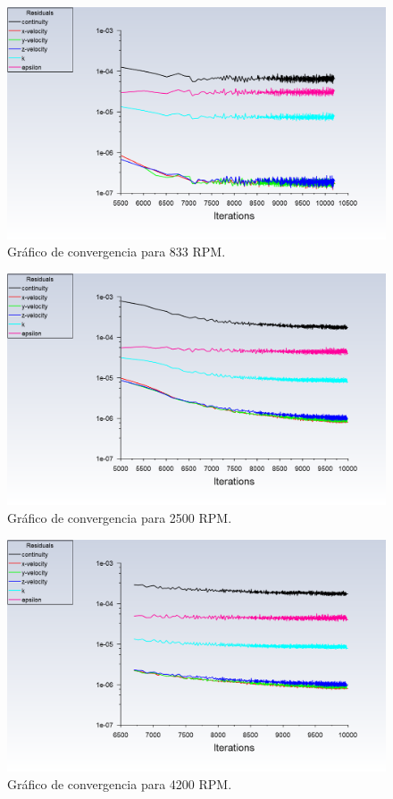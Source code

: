\begin{figure}[!ht]
    \centering
    \includegraphics[width=0.7\linewidth]{images/res1.png}
    \caption{Gráfico de convergencia para 833 RPM.}
    \label{fig:res1}
\end{figure}

\pagebreak

\begin{figure}[!ht]
    \centering
    \includegraphics[width=0.7\linewidth]{images/res2.png}
    \caption{Gráfico de convergencia para 2500 RPM.}
    \label{fig:res2}
\end{figure}

\begin{figure}[!ht]
    \centering
    \includegraphics[width=0.7\linewidth]{images/res3.png}
    \caption{Gráfico de convergencia para 4200 RPM.}
    \label{fig:res3}
\end{figure}

